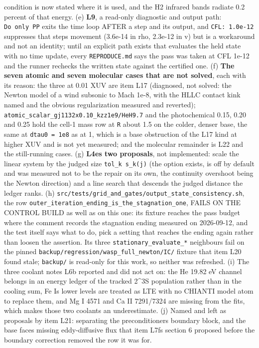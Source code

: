 \documentclass[english,a4paper]{my_memo}
\begin{document}
\begin{itemize}
  condition is now stated where it is used, and the H2 infrared bands radiate
  0.2 percent of that energy. (e) \textbf{L9}, a read-only diagnostic and output
  path: \texttt{Do\ only\ PP} exits the time loop AFTER a step and its output, and
  \texttt{CFL:\ 1.0e-12} suppresses that step\textquotesingle s movement (3.6e-14 in rho, 2.3e-12 in
  v) but is a workaround and not an identity; until an explicit path exists
  that evaluates the held state with no time update, every \texttt{REPRODUCE.md} says
  the pass was taken at CFL 1e-12 and the runner rechecks the written state
  against the certified one. (f) \textbf{The seven atomic and seven molecular cases
  that are not solved}, each with its reason: the three at 0.01 XUV are item
  L17 (diagnosed, not solved: the Newton model of a wind subsonic to Mach 1e-8,
  with the HLLC contact kink named and the obvious regularization measured and
  reverted); \texttt{atomic\_scalar\_gj1132x0.10\_kzz1e9/HeH9.7} and the photochemical
  0.15, 0.20 and 0.25 hold the cell-1 mass row at \texttt{\textbar{}\textbar{}R\textbar{}\textbar{}} about 1.5 on the
  colder, denser base, the same at \texttt{dtau0\ =\ 1e8} as at 1, which is a base
  obstruction of the L17 kind at higher XUV and is not yet measured; and the
  molecular remainder is L22 and the still-running cases. (g) \textbf{L4e\textquotesingle s two
  proposals}, not implemented: scale the linear system by the judged size
  \texttt{tol\_k\ s\_k(j)} (the option exists, is off by default and was measured not to
  be the repair on its own, the continuity overshoot being the Newton
  direction) and a line search that descends the judged distance the ledger
  ranks. (h) \texttt{src/tests/grid\_and\_gates/output\_state\_consistency.sh}, the row
  \texttt{outer\_iteration\_ending\_is\_the\_stagnation\_one}, FAILS ON THE CONTROL BUILD
  as well as on this one: its fixture reaches the pass budget where the comment
  records the stagnation ending measured on 2026-09-12, and the test itself
  says what to do, pick a setting that reaches the ending again rather than
  loosen the assertion. Its three \texttt{stationary\_evaluate\_*} neighbours fail on
  the pinned \texttt{backup/regression/wasp\_full\_newton/IC/} fixture that item L20
  found stale; \texttt{backup/} is read-only for this work, so neither was refreshed.
  (i) The three coolant notes L6b reported and did not act on: the He 19.82 eV
  channel belongs in an energy ledger of the tracked 2\^{}3S population rather
  than in the cooling sum, Fe I\textquotesingle s lower levels are treated as LTE with no
  CHIANTI model atom to replace them, and Mg I 4571 and Ca II 7291/7324 are
  missing from the fits, which makes those two coolants an underestimate. (j)
  Named and left as proposals by item L21: separating the preconditioner\textquotesingle s
  boundary block, and the base face\textquotesingle s missing eddy-diffusive flux that item
  L7f\textquotesingle s section 6 proposed before the boundary correction removed the row it
  was for.
\end{itemize}
\end{document}
